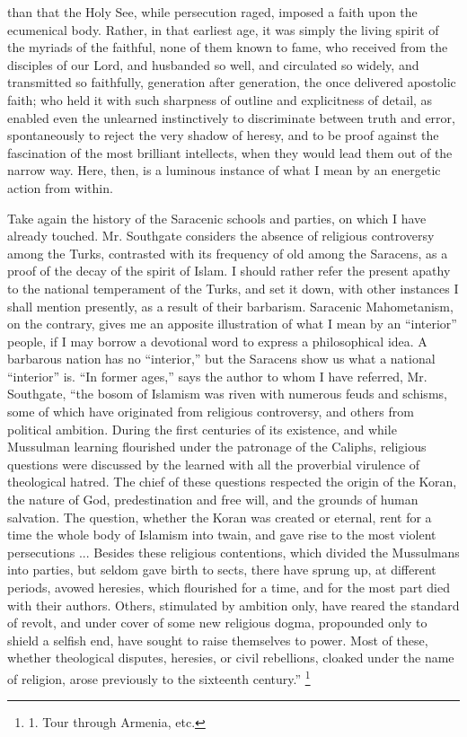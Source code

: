 than that the Holy See, while persecution raged, imposed a faith upon
the ecumenical body. Rather, in that earliest age, it was simply the
living spirit of the myriads of the faithful, none of them known to
fame, who received from the disciples of our Lord, and husbanded so
well, and circulated so widely, and transmitted so faithfully,
generation after generation, the once delivered apostolic faith; who
held it with such sharpness of outline and explicitness of detail, as
enabled even the unlearned instinctively to discriminate between truth
and error, spontaneously to reject the very shadow of heresy, and
to be proof against the fascination of the most brilliant
intellects, when they would lead them out of the narrow way. Here,
then, is a luminous instance of what I mean by an energetic action
from within.

Take again the history of the
Saracenic schools and parties, on which I have already touched. Mr.
Southgate considers the absence of religious controversy among the
Turks, contrasted with its frequency of old among the Saracens, as a
proof of the decay of the spirit of Islam. I should rather refer the
present apathy to the national temperament of the Turks, and set it
down, with other instances I shall mention presently, as a result of
their barbarism. Saracenic Mahometanism, on the contrary, gives me an
apposite illustration of what I mean by an ``interior'' people, if I may
borrow a devotional word to express a philosophical idea. A barbarous
nation has no ``interior,'' but the Saracens show us what a national ``interior''
is. ``In former ages,'' says the author to whom I have referred, Mr.
Southgate, ``the bosom of Islamism was riven with numerous feuds and
schisms, some of which have originated from religious controversy, and
others from political ambition. During the first centuries of its
existence, and while Mussulman learning flourished under the patronage
of the Caliphs, religious questions were discussed by the learned with
all the proverbial virulence of theological hatred. The chief of these
questions respected the origin of the Koran, the nature of God,
predestination and free will, and the grounds of human salvation. The
question, whether the Koran was created or eternal, rent for a time
the whole body of Islamism into twain, and gave rise to the most
violent persecutions ... Besides these religious contentions, which
divided the Mussulmans into parties, but seldom gave birth to sects,
there have sprung up, at different periods, avowed heresies,
which flourished for a time, and for the most part died with their
authors. Others, stimulated by ambition only, have reared the standard
of revolt, and under cover of some new religious dogma, propounded
only to shield a selfish end, have sought to raise themselves to
power. Most of these, whether theological disputes, heresies, or civil
rebellions, cloaked under the name of religion, arose previously to
the sixteenth century.'' \footnote{1. Tour through Armenia, etc.}

